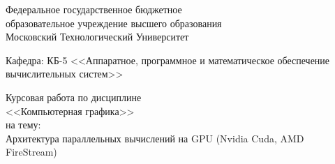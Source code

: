 \begin{titlepage}
\begin{center} %

\bfseries

	{\large 
          Федеральное государственное бюджетное\\
          образовательное учреждение высшего образования \\
          Московский Технологический Университет	
	} %

\vspace{30pt}


	{\large 
	}


\vspace{5pt}

\mdseries
	{\large  {Кафедра: КБ-5 <<Аппаратное, программное и математическое обеспечение вычислительных систем>>}
	
	} %

\vspace{20pt}

{\large	\DoloresCyr Курсовая работа по дисциплине \\ <<Компьютерная графика>> \\ на тему: \\
  \LARGE{Архитектура параллельных вычислений на GPU (Nvidia Cuda, AMD FireStream)}
	
	}

\vspace{12pt}


\end{center} %


\end{titlepage}
